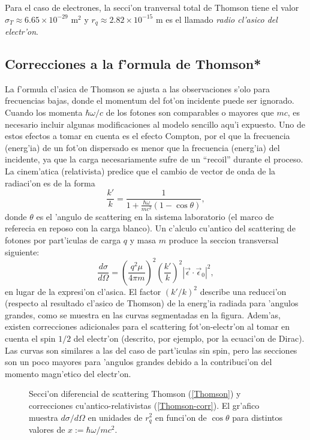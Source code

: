 Para el caso de electrones, la secci'on tranversal total de Thomson tiene el valor $\sigma_{T}\approx 6.65\times 10^{-29}$ m$^2$ y $r_q\approx 2.82\times 10^{-15}$ m es el llamado \textit{radio cl'asico del electr'on}.

\subsection{Correcciones a la f'ormula de Thomson*}
La f'ormula cl'asica de Thomson se ajusta a las observaciones s'olo para frecuencias bajas, donde el momentum del fot'on incidente puede ser ignorado. Cuando los momenta $\hbar\omega/c$ de los fotones son comparables o mayores que $mc$, es necesario incluir algunas modificaciones al modelo sencillo aqu'i expuesto. Uno de estos efectos a tomar en cuenta es el efecto Compton, por el que la frecuencia (energ'ia) de un fot'on dispersado es menor que la frecuencia (energ'ia) del incidente, ya que la carga necesariamente sufre de un ``recoil'' durante el proceso. La cinem'atica (relativista) predice que el cambio de vector de onda de la radiaci'on es de la forma
\begin{equation}
\frac{k'}{k}=\frac{1}{1+\frac{\hbar\omega}{mc^2}\left(  1-\cos
\theta\right)  }, \label{Thomson}
\end{equation}
donde $\theta$ es el 'angulo de scattering en la sistema laboratorio (el marco
de referecia en reposo con la carga blanco). Un c'alculo cu'antico del
scattering de fotones por part'iculas de carga $q$ y masa $m$ produce la seccion
transversal siguiente:
\begin{equation}
\frac{d\sigma}{d\Omega}=\left(\frac{q^2\mu}{4\pi m}\right)^2  \left(
\frac{k'}{k}\right)^2\left|  \vec{\epsilon}\cdot\vec{\epsilon}_0\right|
^2 , \label{Thomson-corr}
\end{equation}
en lugar de la expresi'on cl'asica. El factor $(k'/k)^2$ describe una
reducci'on  (respecto al resultado cl'asico de Thomson) de la energ'ia radiada
para 'angulos grandes, como se muestra en las curvas segmentadas en la figura.
Adem'as, existen correcciones adicionales para el scattering fot'on-electr'on al
tomar en cuenta el spin ${1}/{2}$ del electr'on (descrito, por ejemplo, por
la ecuaci'on de Dirac). Las curvas son similares a las del caso de part'iculas
sin spin, pero las secciones son un poco mayores para 'angulos grandes debido a
la contribuci'on del momento magn'etico del electr'on.

\begin{figure}[!h]
\centerline{}
 \caption{Secci'on diferencial de scattering Thomson (\ref{Thomson}) y
correcciones cu'antico-relativistas (\ref{Thomson-corr}). El gr'afico muestra
${d\sigma}/{d\Omega}$ en unidades de $r_q^2$ en funci'on de
$\cos\theta$ para distintos valores de $x:={\hbar\omega}/{mc^2}$.}
\label{thomson}
\end{figure}

